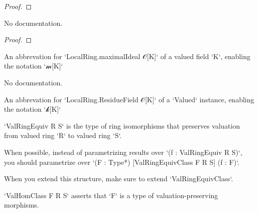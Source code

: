 \begin{definition}
\begin{proof}
    \leanok
\end{proof}

\begin{theorem}\label{Valued.integer_val_le_one}
        \leanok
                No documentation.
    \end{theorem}

\begin{proof}
    \leanok
\end{proof}

\begin{definition}\label{Valued.maximalIdeal}
        \leanok
                An abbrevation for `LocalRing.maximalIdeal 𝒪[K]` of a valued field `K`, enabling the notation `𝓂[K]`
    \end{definition}

\begin{theorem}\label{Valued.maximalIdeal_eq}
                No documentation.
    \end{theorem}

\begin{definition}\label{Valued.ResidueField}
        \leanok
                An abbrevation for `LocalRing.ResidueField 𝒪[K]` of a `Valued` instance, enabling the notation `𝓀[K]`
    \end{definition}

\begin{definition}\label{ValRingEquiv}
        \leanok
                `ValRingEquiv R S` is the type of ring isomorphisms that preserves valuation from valued ring `R` to valued ring `S`.

When possible, instead of parametrizing results over `(f : ValRingEquiv R S)`,
you should parametrize over `(F : Type*) [ValRingEquivClass F R S] (f : F)`.

When you extend this structure, make sure to extend `ValRingEquivClass`.
    \end{definition}

\begin{definition}\label{ValRingHomClass}
        \leanok
                `ValHomClass F R S` asserts that `F` is a type of valuation-preserving morphisms.
    \end{definition}


\end{definition}
